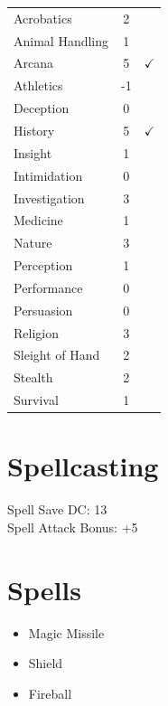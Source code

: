 \documentclass[11pt]{article}
\begin{document}
\begin{tabular}{l c c}

Acrobatics & 2 &  \\

Animal Handling & 1 &  \\

Arcana & 5 &  $\checkmark$  \\

Athletics & -1 &  \\

Deception & 0 &  \\

History & 5 &  $\checkmark$  \\

Insight & 1 &  \\

Intimidation & 0 &  \\

Investigation & 3 &  \\

Medicine & 1 &  \\

Nature & 3 &  \\

Perception & 1 &  \\

Performance & 0 &  \\

Persuasion & 0 &  \\

Religion & 3 &  \\

Sleight of Hand & 2 &  \\

Stealth & 2 &  \\

Survival & 1 &  \\

\end{tabular}

\section*{Spellcasting}

Spell Save DC: 13 \\
Spell Attack Bonus: +5

\section*{Spells}

\begin{itemize}

\item Magic Missile

\item Shield

\item Fireball

\end{itemize}
\end{document}
